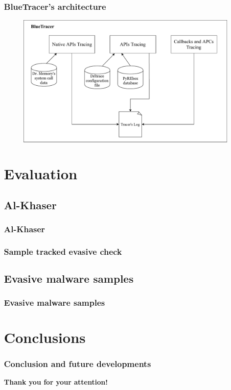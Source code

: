\documentclass[compress]{beamer}
\begin{document}
\begin{frame}
    \frametitle{BlueTracer's architecture}
    
    \begin{figure}
    	\vspace{-0.5cm}
        \includegraphics[width=11cm]{image/BlueTracer.pdf}
    \end{figure}
    
	

\end{frame}

\section{Evaluation}

\subsection{Al-Khaser}
\begin{frame}
    \frametitle{Al-Khaser}
	

\end{frame}

\begin{frame}
    \frametitle{Sample tracked evasive check}
	

\end{frame}

\subsection{Evasive malware samples}
\begin{frame}
    \frametitle{Evasive malware samples}
	

\end{frame}

\section{Conclusions}

\begin{frame}
    \frametitle{Conclusion and future developments}
	

\end{frame}

\begin{frame}
\begin{center}
{\fontsize{15}{15}\selectfont \textbf{Thank you for your attention!}}
\end{center}
\end{frame}
\end{document}
